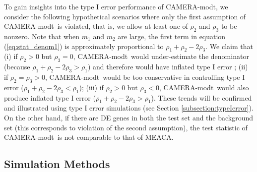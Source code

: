 \documentclass[a4,center,fleqn]{NAR}
\newcommand{\OurMethod}{MEACA}
\newcommand{\CMT}{CAMERA-modt}
\begin{document}
		To gain insights into the type I error performance of \CMT, we 
		consider the following hypothetical scenarios where only the first assumption of \CMT~is 
		violated, that is, we allow at least one of $\rho_2$ and $\rho_3$ to be nonzero. Note that 
		when 
		$m_1$ and $m_2$ are large, the first term in equation (\ref{eq:stat_denom1}) is 
		approximately 
		proportional to $\rho_1+\rho_2-2\rho_3$. We claim that (i) if 
		$\rho_2>0$ but $\rho_3=0$, \CMT~would under-estimate the denominator (because 
		$\rho_1+\rho_2-2\rho_3 > \rho_1$) and therefore 
		would have inflated type I error ; (ii) if 
		$\rho_2=\rho_3>0$, \CMT~would be too conservative 
		in controlling type I error ($\rho_1+\rho_2-2\rho_3 < \rho_1$); (iii) if $\rho_2>0$ but 
		$\rho_3< 0$, \CMT~would also produce 
		inflated type I error ($\rho_1+\rho_2-2\rho_3 > \rho_1$). These trends will be confirmed 
		and 
		illustrated using type I error simulations (see Section \ref{subsection:typeIerror}). On 
		the 
		other hand, if there 
		are DE genes in both the test set and the background set (this corresponds to violation of 
		the 
		second assumption), the test statistic of \CMT~is not comparable to that of \OurMethod. 
		
	
	
	\subsection{Simulation Methods}
	
\end{document}
